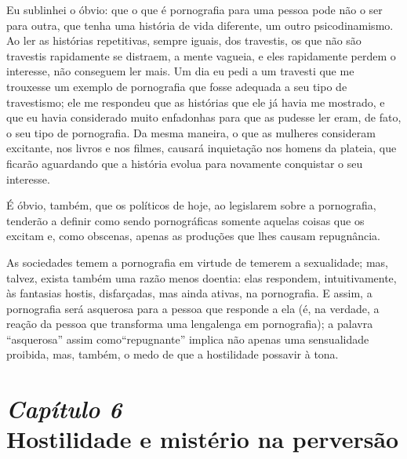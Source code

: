 Eu sublinhei o óbvio: que o que é pornografia para uma pessoa pode
não o ser para outra, que tenha uma história de vida diferente, um
outro psicodinamismo. Ao ler as histórias repetitivas, sempre iguais,
dos travestis, os que não são travestis rapidamente se distraem, a
mente vagueia, e eles rapidamente perdem o interesse, não conseguem ler
mais. Um dia eu pedi a um travesti que me trouxesse um exemplo de
pornografia que fosse adequada a seu tipo de travestismo; ele me
respondeu que as histórias que ele já havia me mostrado, e que eu havia
considerado muito enfadonhas para que as pudesse ler eram, de fato, o
seu tipo de pornografia. Da mesma maneira, o que as mulheres consideram
excitante, nos livros e nos filmes, causará inquietação nos homens da
plateia, que ficarão aguardando que a história evolua para novamente
conquistar o seu interesse.\idxpornomulh[|)]

É óbvio, também, que os políticos de hoje, ao legislarem sobre a
pornografia, tenderão a definir como sendo pornográficas somente
aquelas coisas que os excitam e, como obscenas, apenas as produções que
lhes causam repugnância.

As sociedades temem a pornografia em virtude de temerem a
sexualidade; mas, talvez, exista também uma razão menos doentia: elas
respondem, intuitivamente,\idxpornohost{} às fantasias hostis,\idxhostporn{} disfarçadas, mas ainda
ativas, na pornografia. E assim, a pornografia será asquerosa para a
pessoa que responde a ela (é, na verdade, a reação da pessoa que
transforma uma lengalenga em pornografia); a palavra
``asquerosa'' assim como\idxfantamulh[|)]
``repugnante'' implica não apenas uma
sensualidade proibida, mas, também, o medo de que a hostilidade possa\idxporno[|)]
vir à tona.



\chapter[\textbf{6}\quad Hostilidade e mistério na perversão]{{\large\textit{Capítulo 6}}\\ 
Hostilidade e mistério na perversão}


